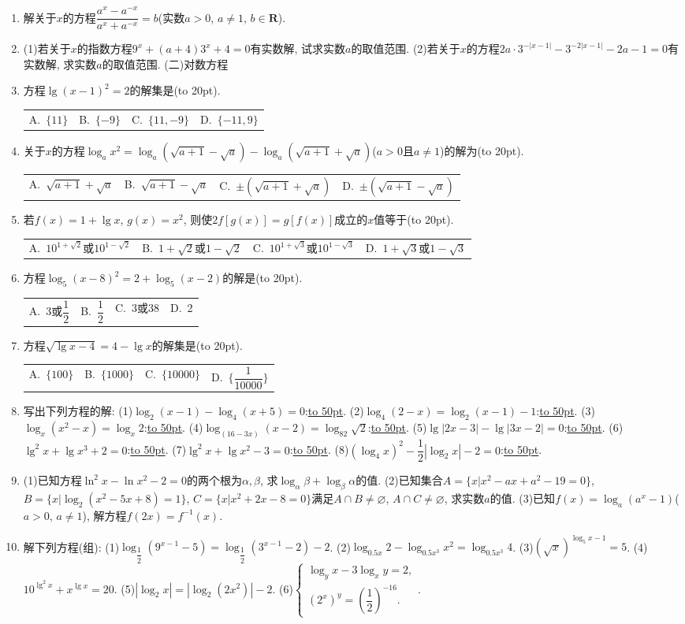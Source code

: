 \documentclass[10pt,a4paper]{article}
\newcommand{\blank}[1]{\underline{\hbox to #1pt{}}}
\newcommand{\bracket}[1]{(\hbox to #1pt{})}
\newcommand{\fourch}[4]{\par\begin{tabular}{p{.23\textwidth}p{.23\textwidth}p{.23\textwidth}p{.23\textwidth}}
A.~#1 &B.~#2& C.~#3& D.~#4
\end{tabular}}
\begin{document}
\begin{enumerate}[1.]
\item 解关于$x$的方程$\dfrac{a^x-a^{-x}}{a^x+a^{-x}}=b$(实数$a>0$, $a\ne 1$, $b\in \mathbf{R}$).
\item (1)若关于$x$的指数方程$9^x+(a+4)3^x+4=0$有实数解, 试求实数$a$的取值范围.
(2)若关于$x$的方程$2a\cdot 3^{-|x-1|}-3^{-2|x-1|}-2a-1=0$有实数解, 求实数$a$的取值范围.
(二)对数方程
\item 方程$\lg (x-1)^2=2$的解集是\bracket{20}.
\fourch{$\{11\}$}{$\{-9\}$}{$\{11,-9\}$}{$\{-11,9\}$}
\item 关于$x$的方程$\log _ax^2=\log _a(\sqrt {a+1}-\sqrt a)-\log _a(\sqrt {a+1}+\sqrt a)$($a>0$且$a\ne 1$)的解为\bracket{20}.
\fourch{$\sqrt {a+1}+\sqrt a$}{$\sqrt {a+1}-\sqrt a$}{$\pm (\sqrt {a+1}+\sqrt a)$}{$\pm (\sqrt {a+1}-\sqrt a)$}
\item 若$f(x)=1+\lg x$, $g(x)=x^2$, 则使$2f[g(x)]=g[f(x)]$成立的$x$值等于\bracket{20}.
\fourch{$10^{1+\sqrt 2}$或$10^{1-\sqrt 2}$}{$1+\sqrt 2$或$1-\sqrt 2$}{$10^{1+\sqrt 3}$或$10^{1-\sqrt 3}$}{$1+\sqrt 3$或$1-\sqrt 3$}
\item 方程$\log _5(x-8)^2=2+\log _5(x-2)$的解是\bracket{20}.
\fourch{3或$\dfrac 12$}{$\dfrac 12$}{3或38}{2}
\item 方程$\sqrt {\lg x-4}=4-\lg x$的解集是\bracket{20}.
\fourch{$\{100\}$}{$\{1000\}$}{$\{10000\}$}{$\{\dfrac 1{10000}\}$}
\item 写出下列方程的解:
(1)$\log _2(x-1)-\log _4(x+5)=0$:\blank{50}.
(2)$\log _4(2-x)=\log _2(x-1)-1$:\blank{50}.
(3)$\log _x(x^2-x)=\log _x2$:\blank{50}.
(4)$\log _{(16-3x)}(x-2)=\log _82\sqrt 2$:\blank{50}.
(5)$\lg|2x-3|-\lg|3x-2|=0$:\blank{50}.
(6)$\lg ^2x+\lg x^3+2=0$:\blank{50}.
(7)$\lg ^2x+\lg x^2-3=0$:\blank{50}.
(8)$(\log _4x)^2-\dfrac 12|\log _2x|-2=0$:\blank{50}.
\item (1)已知方程$\ln ^2x-\ln x^2-2=0$的两个根为$\alpha ,\beta$, 求$\log _{\alpha }\beta +\log _{\beta }\alpha$的值.
(2)已知集合$A=\{x|x^2-ax+a^2-19=0\}$, $B=\{x|\log _2(x^2-5x+8)=1\}$, $C=\{x|x^2+2x-8=0\}$满足$A\cap B\ne \varnothing$, $A\cap C\ne \varnothing$, 求实数$a$的值.
(3)已知$f(x)=\log _a(a^x-1)$($a>0$, $a\ne 1$), 解方程$f(2x)=f^{-1}(x)$.
\item 解下列方程(组):
(1)$\log _{\dfrac 12}(9^{x-1}-5)=\log _{\dfrac 12}(3^{x-1}-2)-2$.
(2)$\log _{0.5x}2-\log _{0.5x^3}x^2=\log _{0.5x^3}4$.
(3)$(\sqrt x)^{\log _5x-1}=5$.
(4)$10^{\lg ^2x}+x^{\lg x}=20$.
(5)$|\log _2x|=|\log _2(2x^2)|-2$.
(6)$\begin{cases} \log _yx-3\log _xy=2, \\ (2^x)^y=(\dfrac 12)^{-16}. \end{cases}$.

\end{enumerate}
\end{document}
